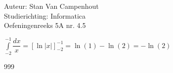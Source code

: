 \documentclass[a4paper]{article}
\begin{document}
  
\noindent \large Auteur: Stan Van Campenhout \\
\noindent \large Studierichting:  Informatica\\
\noindent \large Oefeningenreeks 5A nr. 4.5\\

\medskip

\normalsize

$ \displaystyle\int\limits_{-2}^{-1}\dfrac{dx}{x} = \left[\ln|x|\right]_{-2}^{-1} = \ln(1) - \ln(2) = -\ln(2) $\\

\begin{thebibliography}{999}
\end{thebibliography}
\end{document}
